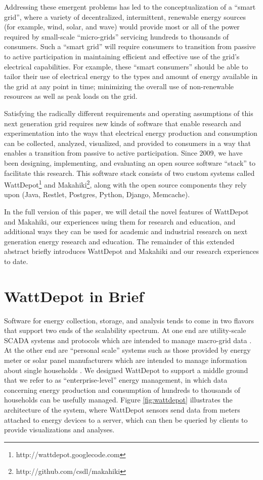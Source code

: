 \documentclass{acm_proc_article-sp}
\begin{document}
Addressing these emergent problems has led to the conceptualization of a ``smart grid'',
where a variety of decentralized, intermittent, renewable energy sources (for example,
wind, solar, and wave) would provide most or all of the power required by small-scale
``micro-grids'' servicing hundreds to thousands of consumers. Such a ``smart
grid'' will require consumers to transition from passive to active participation in
maintaining efficient and effective use of the grid's electrical capabilities.  For
example, these ``smart consumers'' should be able to tailor their use of electrical energy
to the types and amount of energy available in the grid at any point in time; minimizing
the overall use of non-renewable resources as well as peak loads on the grid.

Satisfying the radically different requirements and operating assumptions of this next
generation grid requires new kinds of software that enable research and experimentation
into the ways that electrical energy production and consumption can be collected,
analyzed, visualized, and provided to consumers in a way that enables a transition from
passive to active participation.  Since 2009, we have been designing, implementing, and
evaluating an open source software ``stack'' to facilitate this research.  This software
stack consists of two custom systems called
WattDepot\footnote{http://wattdepot.googlecode.com} and
Makahiki\footnote{http://github.com/csdl/makahiki}, along with the open source components
they rely upon (Java, Restlet, Postgres, Python, Django, Memcache).

In the full version of this paper, we will detail the novel features of WattDepot and
Makahiki, our experiences using them for research and education, and additional ways they
can be used for academic and industrial research on next generation energy research and
education.  The remainder of this extended abstract briefly introduces WattDepot and
Makahiki and our research experiences to date.

\section{WattDepot in Brief}

Software for energy collection, storage, and analysis tends to come in two flavors that
support two ends of the scalability spectrum.  At one end are utility-scale SCADA systems
and protocols which are intended to manage macro-grid data
\cite{SmartEnergy2.0,OSHAN,OpenPDC}.  At the other end are ``personal scale'' systems such
as those provided by energy meter or solar panel manufacturers which are intended to
manage information about single households \cite{TED,EMS100}.  We designed WattDepot to
support a middle ground that we refer to as ``enterprise-level'' energy management, in
which data concerning energy production and consumption of hundreds to thousands of
households can be usefully managed.  Figure \ref{fig:wattdepot} illustrates the
architecture of the system, where WattDepot sensors send data from meters attached to
energy devices to a server, which can then be queried by clients to provide visualizations
and analyses.
\end{document}
